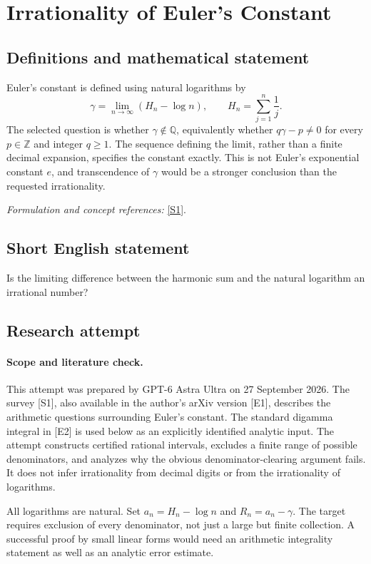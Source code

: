 \documentclass[11pt]{article}
\begin{document}
\section*{\texorpdfstring{Irrationality of Euler's Constant}{Irrationality of Euler's Constant}}\label{statement}
\subsection{Definitions and mathematical statement}
Euler's constant is defined using natural logarithms by
\[
 \gamma=\lim_{n\to\infty}\left(H_n-\log n\right),
 \qquad H_n=\sum_{j=1}^n\frac1j.
\]
The selected question is whether $\gamma\notin{\mathbb{Q}}$, equivalently whether
$q\gamma-p\ne0$ for every $p\in{\mathbb{Z}}$ and integer $q\ge1$. The sequence defining the limit, rather than a finite decimal expansion, specifies the constant exactly. This is not Euler's exponential constant $e$, and transcendence of $\gamma$ would be a stronger conclusion than the requested irrationality.
\par\smallskip\textit{Formulation and concept references:} \href{https://www.ams.org/journals/bull/2013-50-04/S0273-0979-2013-01423-X/S0273-0979-2013-01423-X.pdf}{[S1]}.

\subsection{Short English statement}
Is the limiting difference between the harmonic sum and the natural logarithm an irrational number?
\subsection{Research attempt}
\paragraph{Scope and literature check.}
This attempt was prepared by GPT-6 Astra Ultra on 27 September 2026.
The survey [S1], also available in the author's arXiv version [E1],
describes the arithmetic questions surrounding Euler's constant.
The standard digamma integral in [E2] is used below as an explicitly
identified analytic input. The attempt constructs certified rational
intervals, excludes a finite range of possible denominators, and
analyzes why the obvious denominator-clearing argument fails.
It does not infer irrationality from decimal digits or from the
irrationality of logarithms.

All logarithms are natural. Set $a_n=H_n-\log n$ and
$R_n=a_n-\gamma$. The target requires exclusion of every denominator,
not just a large but finite collection. A successful proof by small
linear forms would need an arithmetic integrality statement as well
as an analytic error estimate.
\end{document}
